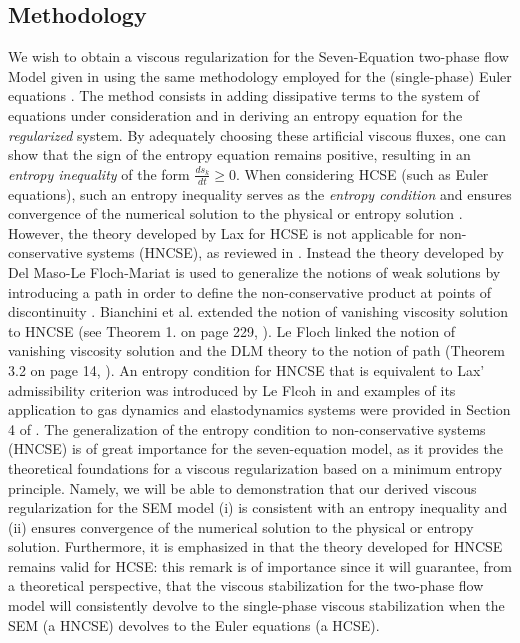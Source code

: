 \subsection{Methodology}
%
We wish to obtain a viscous regularization for the Seven-Equation two-phase flow Model given in  using the same methodology 
employed for the (single-phase) Euler equations \cite{jlg_VR_SIAM_2004,Marco_paper_low_mach}. The method consists in adding dissipative terms to the system of equations under 
consideration and in deriving an entropy equation for the {\it regularized} system. By adequately choosing these artificial viscous fluxes, one can 
show that the sign of the entropy equation remains positive, resulting in an \emph{entropy inequality} of the form $\frac{d s_k}{dt} \geq 0$. When considering 
HCSE (such as Euler equations), such an entropy inequality serves as the \emph{entropy condition} and ensures convergence of the numerical solution to
the physical or entropy solution \cite{Lax}. However, the theory developed by Lax for HCSE \cite{Lax} is not applicable for non-conservative systems (HNCSE), as reviewed in .
Instead the theory developed by Del Maso-Le Floch-Mariat is used to generalize the notions of weak solutions by introducing a path 
in order to define the non-conservative product at points of discontinuity \cite{dlm}. 
Bianchini et al. extended the notion of vanishing viscosity solution to HNCSE (see Theorem 1. on page 229,  \cite{bianchini_bressan_2005}). 
Le Floch linked the notion of vanishing viscosity solution and the DLM theory to the notion of path (Theorem 3.2 on page 14, \cite{lefloch_1989}). 
An entropy condition for HNCSE that is equivalent to Lax' admissibility criterion was introduced by Le Flcoh in \cite{lefloch_1988} and 
examples of its application to gas dynamics and elastodynamics systems were provided in Section 4 of \cite{lefloch_1988}. 
The generalization of the entropy condition to non-conservative systems (HNCSE) is of great importance for the seven-equation model,
as it provides the theoretical foundations for a viscous regularization based on a minimum entropy principle. Namely, 
we will be able to demonstration that our derived viscous regularization for the SEM model
(i) is consistent with an entropy inequality and (ii) ensures convergence of the numerical solution to the physical or entropy solution. 
Furthermore, it is emphasized in \cite{dlm,bianchini_bressan_2005,lefloch_1989} that the theory developed 
for HNCSE remains valid for HCSE:
this remark is of importance since it will guarantee, from a 
theoretical perspective, that the viscous stabilization for the two-phase flow model will consistently devolve to the single-phase viscous stabilization
when the SEM (a HNCSE) devolves to the Euler equations (a HCSE). 

